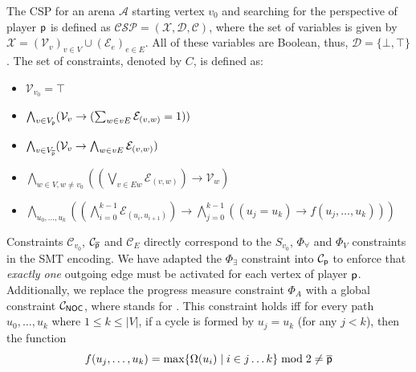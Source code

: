 \documentclass[a4paper,fleqn]{cas-sc}
\begin{document}
\begin{definition}\label{def:csp}
    The CSP for an arena $\mathcal{A}$ starting vertex $v_0$ and searching for the perspective of player $\mathsf{p}$ is defined as $\mathcal{CSP = (X, D, C)}$, where the set of variables is given by $\mathcal{X} = (\mathcal{V}_v)_{v \in V} \cup (\mathcal{E}_e)_{e \in E}$. All of these variables are Boolean, thus, $\mathcal{D} = \{\bot,\top\}$. The set of constraints, denoted by $C$, is defined as:
    \begin{itemize}
        [leftmargin=3.0cm, labelwidth=2.8cm, align=right, itemsep=1.0ex, parsep=0pt]

        \item [$\mathcal{C}_{v_0}$ :] $\mathcal{V}_{v_0} = \top$

        \item [$\mathcal{C}_{\player}$ :] $\bigwedge_{v \in V_{\mathsf{p}}} (\mathcal{V}_v \rightarrow (\sum_{w \in vE} \mathcal{E}_{(v,w)}= 1))$

        \item [$\mathcal{C}_{\opponent}$ :] $\bigwedge_{v \in V_{\overline{\mathsf{p}}}} (\mathcal{V}_v \rightarrow \bigwedge_{w \in vE} \mathcal{E}_{(v,w)})$

        \item [$\mathcal{C}_{\!E}$ :] $\bigwedge_{w \in V, w \neq v_0} ((\bigvee_{v \in Ew} \mathcal{E}_{(v,w)}) \rightarrow \mathcal{V}_w)$

        \item [$\mathcal{C}_{\noc}(f)$ :] $\bigwedge_{u_0, \dots, u_k} \left( \left(\bigwedge_{i=0}^{k-1} \mathcal{E}_{(u_i,u_{i+1})}\right) \to \bigwedge_{j=0}^{k-1} ((u_j = u_k) \to f(u_j, \dots, u_k)) \right)$

    \end{itemize}

\end{definition}

Constraints $\mathcal{C}_{v_0}$, $\mathcal{C}_{\opponent}$ and $\mathcal{C}_{\!E}$ directly correspond to the $S_{v_0}$, $\Phi_\forall$ and $\Phi_V$ constraints in the SMT encoding. We have adapted the $\Phi_\exists$ constraint into $\mathcal{C}_{\player}$ to enforce that \emph{exactly one} outgoing edge must be activated for each vertex of player $\mathsf{p}$. Additionally, we replace the progress measure constraint $\Phi_A$ with a global constraint $\mathcal{C}_{{\textsf{NOC}}}$, where \noc stands for \nooppc. This constraint holds iff for every path $u_0,\ldots,u_k$ where $1\leq k\leq |V|$, if a cycle is formed by $u_j = u_k$ (for any $j < k$), then the function
\[
f(u_j, \dots, u_k) = \max\{\Omega(u_i) \mid i\in j\dots k\} \bmod 2 \ne \overline{\mathsf{p}}
\]
\end{document}

